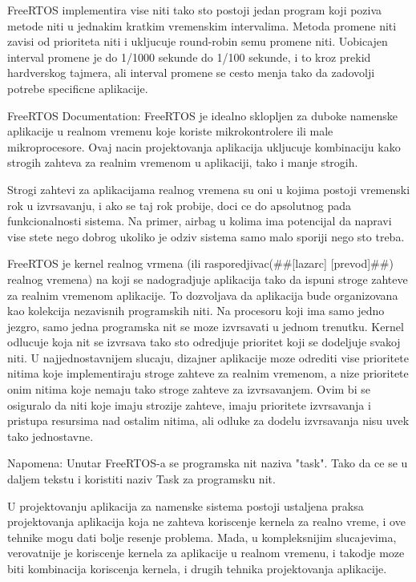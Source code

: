 \documentclass[a4paper,12pt, master]{etf}
\begin{document}
	FreeRTOS implementira vise niti tako sto postoji jedan program koji poziva metode niti u
	jednakim kratkim vremenskim intervalima. Metoda promene niti zavisi od prioriteta niti i
	ukljucuje round-robin semu promene niti. Uobicajen interval promene je do 1/1000 sekunde do
	1/100 sekunde, i to kroz prekid hardverskog tajmera, ali interval promene se cesto menja tako
	da zadovolji potrebe specificne aplikacije.

	FreeRTOS Documentation:
	FreeRTOS je idealno sklopljen za duboke namenske aplikacije u realnom vremenu koje koriste
	mikrokontrolere ili male mikroprocesore. Ovaj nacin projektovanja aplikacija ukljucuje
	kombinaciju kako strogih zahteva za realnim vremenom u aplikaciji, tako i manje strogih.

	Strogi zahtevi za aplikacijama realnog vremena su oni u kojima postoji vremenski rok u
	izvrsavanju, i ako se taj rok probije, doci ce do apsolutnog pada funkcionalnosti sistema. Na
	primer, airbag u kolima ima potencijal da napravi vise stete nego dobrog ukoliko je odziv
	sistema samo malo sporiji nego sto treba.

	FreeRTOS je kernel realnog vrmena (ili rasporedjivac(\#\#[lazarc] [prevod]\#\#) realnog vremena) na
	koji se nadogradjuje aplikacija tako da ispuni stroge zahteve za realnim vremenom aplikacije.
	To dozvoljava da aplikacija bude organizovana kao kolekcija nezavisnih programskih niti. Na
	procesoru koji ima samo jedno jezgro, samo jedna programska nit se moze izvrsavati u jednom
	trenutku. Kernel odlucuje koja nit se izvrsava tako sto odredjuje prioritet koji se dodeljuje
	svakoj niti. U najjednostavnijem slucaju, dizajner aplikacije moze odrediti vise prioritete
	nitima koje implementiraju stroge zahteve za realnim vremenom, a nize prioritete onim nitima
	koje nemaju tako stroge zahteve za izvrsavanjem. Ovim bi se osiguralo da niti koje imaju
	strozije zahteve, imaju prioritete izvrsavanja i pristupa resursima nad ostalim nitima, ali
	odluke za dodelu izvrsavanja nisu uvek tako jednostavne.

	Napomena: Unutar FreeRTOS-a se programska nit naziva "task". Tako da ce se u daljem tekstu i
	koristiti naziv Task za programsku nit.

	U projektovanju aplikacija za namenske sistema postoji ustaljena praksa projektovanja
	aplikacija koja ne zahteva koriscenje kernela za realno vreme, i ove tehnike mogu dati bolje
	resenje problema. Mada, u kompleksnijim slucajevima, verovatnije je koriscenje kernela za
	aplikacije u realnom vremenu, i takodje moze biti kombinacija koriscenja kernela, i drugih
	tehnika projektovanja aplikacije.
\end{document}
